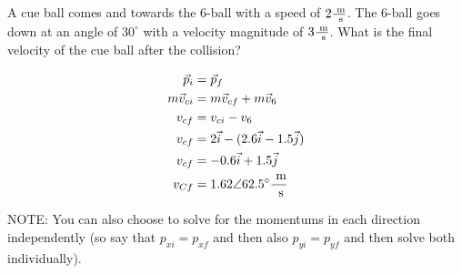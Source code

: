 \begin{problem}
    A cue ball comes and towards the 6-ball with a speed of $2 \frac{\text{ m}}{\text{ s}}$. The 6-ball goes down at an angle of $30^\circ$ with a velocity magnitude of $3 \frac{\text{ m}}{\text{ s}}$. What is the final velocity of the cue ball after the collision?
    
    \[
    \begin{aligned}
        \vec p_i &= \vec p_f\\
        m\vec v_{ci} &= m\vec v_{cf} + m\vec v_6\\
        v_{cf} &= v_{ci}-v_6\\
        v_{cf} &= 2\vec i - (2.6 \vec i - 1.5 \vec j)\\
        v_{cf} &= -0.6\vec i + 1.5 \vec j\\
        v_{Cf} &= 1.62 \angle 62.5^\circ \frac{\text{ m}}{\text{ s}}
    \end{aligned}  
    \]

    NOTE: You can also choose to solve for the momentums in each direction independently (so say that $p_{xi} = p_{xf}$ and then also $p_{yi} = p_{yf}$ and then solve both individually).
\end{problem}